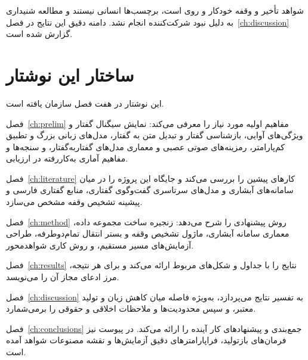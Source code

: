 شواهد تأخیر و وقفه خودکار و روی  است، برچسب‌ها انسانی نیستند و
مطالعه شنیداری به دلیل نبود شرکت‌کننده انجام نشد. دامنه دقیق این نتایج در
فصل~\ref{ch:discussion} گزارش شده است.

\section{ساختار این نوشتار}
\label{sec:structure}

این نوشتار در هفت فصل سازمان یافته است.

فصل~\ref{ch:prelim} مفاهیم اولیه مورد نیاز را معرفی می‌کند: نمایش سیگنال گفتار
و ویژگی‌های آوایی، بازشناسی گفتار و تبدیل متن به گفتار، مدل‌های زبانی بزرگ و
تطبیق کم‌پارامتر، رمزینه‌های صوتی عصبی و معماری مدل‌های گفتار‌به‌گفتار، و
سنجه‌ها و مفاهیم آماری به‌کاررفته در ارزیابی.

فصل~\ref{ch:literature} کارهای پیشین را بررسی می‌کند و جایگاه این پروژه را در
میان سامانه‌های آبشاری و مدل‌های سرتاسری گفت‌وگوی گفتاری، منابع گفتاری فارسی و
پیشینه تشخیص وقفه مشخص می‌سازد.

فصل~\ref{ch:method} روش پیشنهادی را شرح می‌دهد: زنجیره ساخت مجموعه داده،
معماری سامانه آبشاری، ماژول تشخیص وقفه و بستر انتقال تمام‌دوطرفه، طراحی
آزمایش‌های مسیر مستقیم، و روش کاری شواهد‌محور.

فصل~\ref{ch:results} نتایج را با جداول و شکل‌های مربوط ارائه می‌کند و برای هر
نتیجه، مرز ادعای مجاز آن را می‌نویسد.

فصل~\ref{ch:discussion} به تفسیر نتایج می‌پردازد، به‌ویژه فاصله میان کاهش زیان
و تولید معتبر، و سپس محدودیت‌ها و ملاحظات اخلاقی و حقوقی را برمی‌شمارد.

فصل~\ref{ch:conclusions} جمع‌بندی و پیشنهادهای کار آینده را ارائه می‌کند. در
پیوست نیز فرمان‌های بازتولید، فراپارامترهای دقیق آزمایش‌ها و نقشه مصنوعات
شواهد آمده است.
